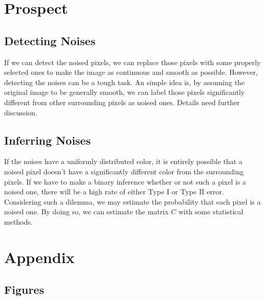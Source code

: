\documentclass[12pt]{article}
\begin{document}
	\section{Prospect}
	
	\subsection{Detecting Noises}
	
	If we can detect the noised pixels, we can replace those pixels with some properly selected ones to make the image as continuous and smooth as possible. However, detecting the noises can be a tough task. An simple idea is, by assuming the original image to be generally smooth, we can label those pixels significantly different from other surrounding pixels as noised ones. Details need further discussion.
	
	\subsection{Inferring Noises}
	
	If the noises have a uniformly distributed color, it is entirely possible that a noised pixel doesn't have a significantly different color from the surrounding pixels. If we have to make a binary inference whether or not such a pixel is a noised one, there will be a high rate of either Type I or Type II error. Considering such a dilemma, we may estimate the probability that each pixel is a noised one. By doing so, we can estimate the matrix $C$ with some statistical methods.
	
	\newpage
	
	\section{Appendix}
	
	\subsection{Figures}
	
\end{document}
